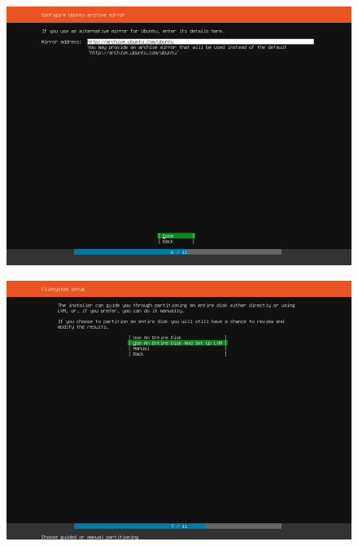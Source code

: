\begin{figure}[h!]
\centering
\captionsetup{skip=\skipfigurecaptionlen}
\includegraphics[width=1\textwidth]{screenshots/IY2D502-2019-02-21-19-16-32.png}
\caption{}
\label{fig:IY2D502-2019-02-21-19-16-32}
\end{figure}
\pagebreak
\begin{figure}[h!]
\centering
\captionsetup{skip=\skipfigurecaptionlen}
\includegraphics[width=1\textwidth]{screenshots/IY2D502-2019-02-21-19-16-38.png}
\caption{}
\label{fig:IY2D502-2019-02-21-19-16-38}
\end{figure}
\pagebreak
